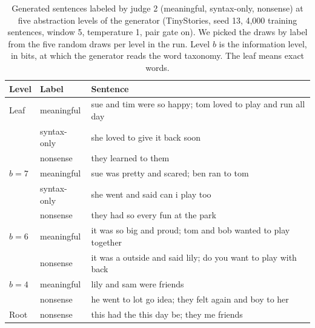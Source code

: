 \documentclass[11pt,letterpaper]{article}
\begin{document}
\begin{table}[!htbp]
\caption{Generated sentences labeled by judge 2 (meaningful, syntax-only, nonsense) at five abstraction levels of the generator (TinyStories, seed 13, 4,000 training sentences, window 5, temperature 1, pair gate on).
We picked the draws by label from the five random draws per level in the run. Level $b$ is the information level, in bits, at which the generator reads the word taxonomy. The leaf means exact words.}
\label{tab:regimecases}
\begin{center}
\footnotesize
\begin{tabular}{llp{}}
\toprule
Level & Label & Sentence \\
\midrule
Leaf & meaningful & sue and tim were so happy; tom loved to play and run all day \\
 & syntax-only & she loved to give it back soon \\
 & nonsense & they learned to them \\
$b=7$ & meaningful & sue was pretty and scared; ben ran to tom \\
 & syntax-only & she went and said can i play too \\
 & nonsense & they had so every fun at the park \\
$b=6$ & meaningful & it was so big and proud; tom and bob wanted to play together \\
 & nonsense & it was a outside and said lily; do you want to play with back \\
$b=4$ & meaningful & lily and sam were friends \\
 & nonsense & he went to lot go idea; they felt again and boy to her \\
Root & nonsense & this had the this day be; they me friends \\
\bottomrule
\end{tabular}
\end{center}
\end{table}
\end{document}
